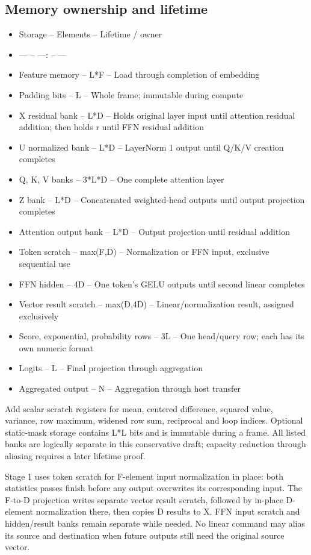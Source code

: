 \documentclass[11pt,a4paper]{article}
\begin{document}
\subsection{Memory ownership and lifetime}
\begin{itemize}
\item Storage -- Elements -- Lifetime / owner
\item --- -- ---: -- ---
\item Feature memory -- L*F -- Load through completion of embedding
\item Padding bits -- L -- Whole frame; immutable during compute
\item X residual bank -- L*D -- Holds original layer input until attention residual addition; then holds r until FFN residual addition
\item U normalized bank -- L*D -- LayerNorm 1 output until Q/K/V creation completes
\item Q, K, V banks -- 3*L*D -- One complete attention layer
\item Z bank -- L*D -- Concatenated weighted-head outputs until output projection completes
\item Attention output bank -- L*D -- Output projection until residual addition
\item Token scratch -- max(F,D) -- Normalization or FFN input, exclusive sequential use
\item FFN hidden -- 4D -- One token's GELU outputs until second linear completes
\item Vector result scratch -- max(D,4D) -- Linear/normalization result, assigned exclusively
\item Score, exponential, probability rows -- 3L -- One head/query row; each has its own numeric format
\item Logits -- L -- Final projection through aggregation
\item Aggregated output -- N -- Aggregation through host transfer
\end{itemize}


Add scalar scratch registers for mean, centered difference, squared value, variance, row maximum, widened row sum, reciprocal and loop indices. Optional static-mask storage contains L*L bits and is immutable during a frame. All listed banks are logically separate in this conservative draft; capacity reduction through aliasing requires a later lifetime proof.

Stage 1 uses token scratch for F-element input normalization in place: both statistics passes finish before any output overwrites its corresponding input. The F-to-D projection writes separate vector result scratch, followed by in-place D-element normalization there, then copies D results to X. FFN input scratch and hidden/result banks remain separate while needed. No linear command may alias its source and destination when future outputs still need the original source vector.
\end{document}
